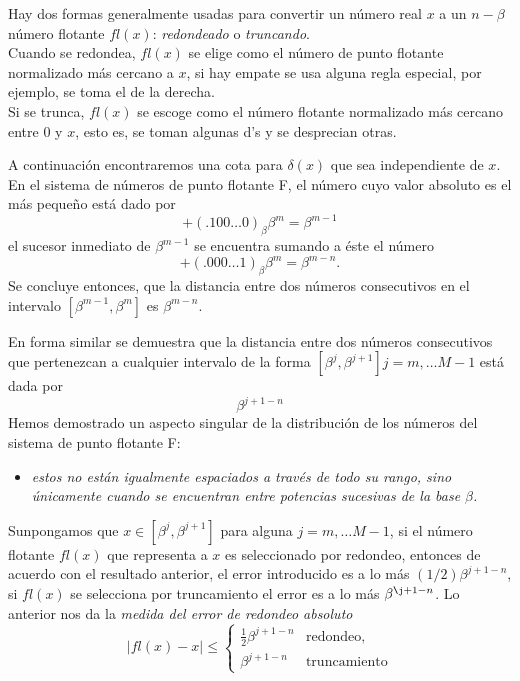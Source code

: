 \begin{frame}
Hay dos formas generalmente usadas para convertir un número real $x$ a un $n-\beta$ número flotante $fl(x)$: \textit{redondeado} o \textit{truncando}.
\\
\medskip
Cuando se redondea, $fl(x)$ se elige como el número de punto flotante normalizado más cercano a $x$, si hay empate se usa alguna regla especial, por ejemplo, se toma el de la derecha.
\\
\medskip
Si se trunca, $fl(x)$ se escoge como el número flotante normalizado más cercano entre $0$ y $x$, esto es, se toman algunas d's y se desprecian otras.
\end{frame}
\begin{frame}
A continuación encontraremos una cota para $\delta (x)$ que sea independiente de $x$. En el sistema de números de punto flotante F, el número cuyo valor absoluto es el más pequeño está dado por
\[ +(.100 \ldots 0)_\beta \beta^{m} = \beta^{m-1} \]
el sucesor inmediato de $\beta^{m-1}$ se encuentra sumando a éste el número
\[ +(.000 \ldots 1)_\beta \beta^{m}  = \beta^{m-n}. \]
Se concluye entonces, que la distancia entre dos números consecutivos en el intervalo $[\beta^{m-1},\beta^{m}]$ es $\beta^{m-n}$.
\end{frame}
\begin{frame}
En forma similar se demuestra que la distancia entre dos números consecutivos que pertenezcan a cualquier intervalo de la forma $[\beta^{j},\beta^{j+1}]j = m,  \ldots M-1$ está dada por
\[ \beta^{j+1-n}\]
Hemos demostrado un aspecto singular de la distribución de los números del sistema de punto flotante F:
\begin{itemize}
\item \emph{estos no están igualmente espaciados a través de todo su rango, sino únicamente
cuando se encuentran entre potencias sucesivas de la base $\beta$.}
\end{itemize}
\end{frame}
\begin{frame}
Sunpongamos que $x \in [\beta^{j} , \beta^{j+1}]$ para alguna $j = m,  \ldots M - 1$, si el número flotante $fl(x)$ que representa a $x$ es seleccionado por redondeo, entonces de acuerdo
con el resultado anterior, el error introducido es a lo más $(1/2) \beta^{j+1-n}$, si $fl(x)$ se selecciona por truncamiento el error es a lo más $\beta^{\j+1-n}$. Lo anterior nos da la \emph{medida del error de redondeo absoluto}
\[ \vert fl(x) - x \vert  \leq
\begin{cases}
\frac{1}{2} \beta^{j+1-n} &\mbox{redondeo,} \\
\beta^{j+1-n} &\mbox{truncamiento}
\end{cases} \]
\end{frame}

